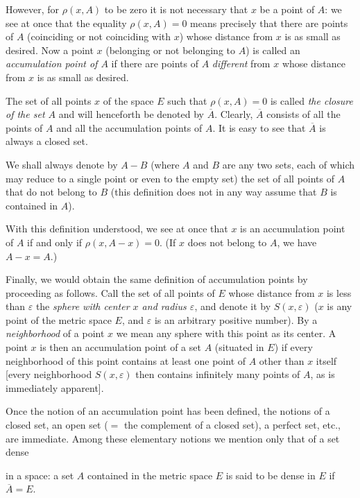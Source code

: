 \documentclass[a4paper,12pt]{amsart}
\newcommand{\srcpage}[1]{} %
\begin{document}
However, for $\rho(x,A)$ to be zero it is not necessary that $x$ be a point of $A$: we see at once that the equality $\rho(x,A)=0$ means precisely that there are points of $A$ (coinciding or not coinciding with $x$) whose distance from $x$ is as small as desired. Now a point $x$ (belonging or not belonging to $A$) is called an \textit{accumulation point of $A$} if there are points of $A$ \textit{different} from $x$ whose distance from $x$ is as small as desired.

The set of all points $x$ of the space $E$ such that $\rho(x,A)=0$ is called \textit{the closure of the set $A$} and will henceforth be denoted by $\overline{A}$. Clearly, $\overline{A}$ consists of all the points of $A$ and all the accumulation points of $A$. It is easy to see that $\overline{A}$ is always a closed set.

We shall always denote by $A-B$ (where $A$ and $B$ are any two sets, each of which may reduce to a single point or even to the empty set) the set of all points of $A$ that do not belong to $B$ (this definition does not in any way assume that $B$ is contained in $A$).

With this definition understood, we see at once that $x$ is an accumulation point of $A$ if and only if $\rho(x,A-x)=0$. (If $x$ does not belong to $A$, we have $A-x=A$.)

Finally, we would obtain the same definition of accumulation points by proceeding as follows. Call the set of all points of $E$ whose distance from $x$ is less than $\varepsilon$ the \textit{sphere with center $x$ and radius $\varepsilon$}, and denote it by $S(x,\varepsilon)$ ($x$ is any point of the metric space $E$, and $\varepsilon$ is an arbitrary positive number). By a \textit{neighborhood} of a point $x$ we mean any sphere with this point as its center. A point $x$ is then an accumulation point of a set $A$ (situated in $E$) if every neighborhood of this point contains at least one point of $A$ other than $x$ itself [every neighborhood $S(x,\varepsilon)$ then contains infinitely many points of $A$, as is immediately apparent].

Once the notion of an accumulation point has been defined, the notions of a closed set, an open set ($=$ the complement of a closed set), a perfect set, etc., are immediate. Among these elementary notions we mention only that of a set dense
\srcpage{45}
in a space: a set $A$ contained in the metric space $E$ is said to be dense in $E$ if $\overline{A}=E$.
\end{document}
